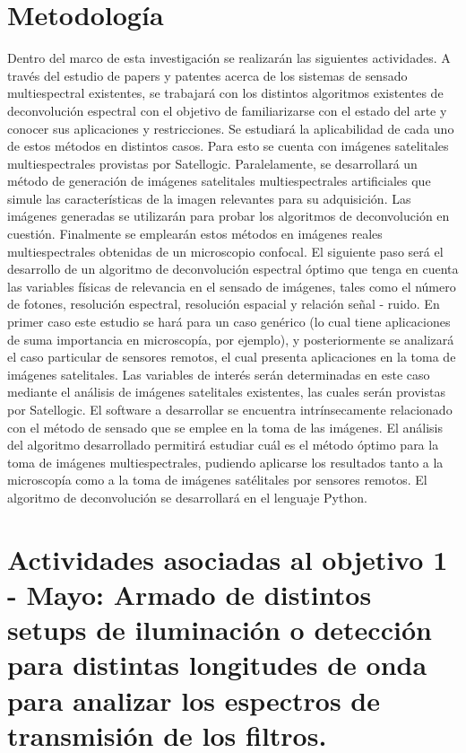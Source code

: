 \documentclass{ctuthesis}
\begin{document}
\section*{Metodología}
Dentro del marco de esta investigación se realizarán las siguientes actividades. A través del estudio de papers y patentes acerca de los sistemas de sensado multiespectral existentes, se trabajará con los distintos algoritmos existentes de deconvolución espectral con el objetivo de familiarizarse con el estado del arte y conocer sus aplicaciones y restricciones. Se estudiará la aplicabilidad de cada uno de estos métodos en distintos casos. Para esto se cuenta con imágenes satelitales multiespectrales provistas por Satellogic. 
Paralelamente, se desarrollará un método de generación de imágenes satelitales multiespectrales artificiales que simule las características de la imagen relevantes para su adquisición. Las imágenes generadas se utilizarán para probar los algoritmos de deconvolución en cuestión. Finalmente se emplearán estos métodos en imágenes reales multiespectrales obtenidas de un microscopio confocal. 
El siguiente paso será el desarrollo de un algoritmo de deconvolución espectral óptimo que tenga en cuenta las variables físicas de relevancia en el sensado de imágenes, tales como el número de fotones, resolución espectral, resolución espacial y relación señal - ruido. En primer caso este estudio se hará para un caso genérico (lo cual tiene aplicaciones de suma importancia en microscopía, por ejemplo), y posteriormente se analizará el caso particular de sensores remotos, el cual presenta aplicaciones en la toma de imágenes satelitales. Las variables de interés serán determinadas en este caso mediante el análisis de imágenes satelitales existentes, las cuales serán provistas por Satellogic.
El software a desarrollar se encuentra intrínsecamente relacionado con el método de sensado que se emplee en la toma de las imágenes. El análisis del algoritmo desarrollado permitirá estudiar cuál es el método óptimo para la toma de imágenes multiespectrales, pudiendo aplicarse los resultados tanto a la microscopía como a la toma de imágenes satélitales por sensores remotos. El algoritmo de deconvolución se desarrollará en el lenguaje Python. 

\section*{Actividades asociadas al objetivo 1 - Mayo: Armado de distintos 
setups de iluminación 
	o detección para distintas longitudes de onda para analizar los espectros 
	de transmisión de los filtros.}
\end{document}
